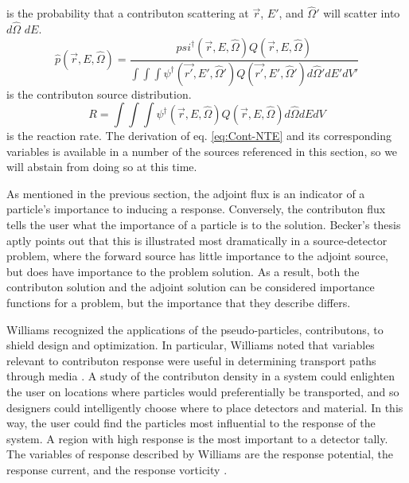 is the probability that a contributon scattering at $\vec{r}$, $E'$, and $\hat\Omega'$ will scatter into $d\hat\Omega$ $dE$.
\begin{equation}
\hat p(\vec{r}, E, \hat\Omega) =
\frac{psi^{\dagger}(\vec{r}, E, \hat\Omega) Q(\vec{r},E,\hat\Omega)}
     {\int \int \int \psi^{\dagger}(\vec{r'},E',\hat\Omega')
     Q(\vec{r'},E',\hat\Omega') d\hat\Omega' dE' dV'}
\end{equation}
is the contributon source distribution.
\begin{equation}
R = \int \int \int \psi^{\dagger}(\vec{r},E,\hat\Omega)Q(\vec{r},E,\hat\Omega)
    d\hat\Omega dE dV
\end{equation}
is the reaction rate.
The derivation of eq. \ref{eq:Cont-NTE} and its corresponding variables is
available in a number of the sources referenced in this section, so we will
abstain from doing so at this time.

As mentioned in the previous section, the adjoint flux is an indicator of a
particle's importance to inducing a response. Conversely, the contributon
flux tells the user what the importance of a particle is to the solution.
Becker's thesis \cite{becker_hybrid_2009} aptly points out that this is
illustrated most dramatically in a source-detector problem, where the forward
source has little importance to the adjoint source, but does have importance to
the problem solution. As a result, both the contributon solution and the adjoint
solution can be considered importance functions for a problem, but the
importance that they describe differs.

Williams recognized the applications of the pseudo-particles, contributons, to
shield design and optimization. In particular, Williams noted that variables
relevant to contributon response were useful in determining transport paths
through media \cite{williams_contributon_study, williams_SCC_shielding}. A study
of the contributon density in a system could enlighten the user on locations
where particles would preferentially be transported, and so designers could
intelligently choose where to place detectors and material. In this way, the
user could find the particles most influential to the response of the system. A
region with high response is the most important to a detector tally. The
variables of response described by Williams are the response potential, the
response current, and the response vorticity \cite{williams_contributorn_1992}.

